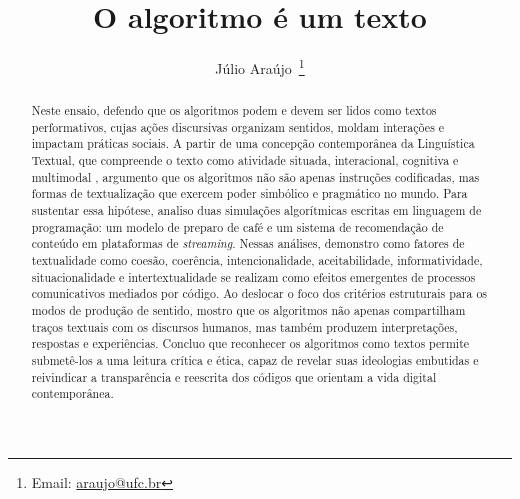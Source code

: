 \documentclass[portuguese]{textolivre}
\title{O algoritmo é um texto}
\author[1]{Júlio Araújo~\orcid{0000-0001-7399-3769}\thanks{Email: \href{mailto:araujo@ufc.br}{araujo@ufc.br}}}
\affil[1]{Universidade Federal do Ceará, Programa de Pós-Graduação em Linguística, Fortaleza, CE, Brasil.}
\begin{document}
\maketitle

\begin{polyabstract}
\begin{abstract}
Neste ensaio, defendo que os algoritmos podem e devem ser lidos como textos performativos, cujas ações discursivas organizam sentidos, moldam interações e impactam práticas sociais. A partir de uma concepção contemporânea da Linguística Textual, que compreende o texto como atividade situada, interacional, cognitiva e multimodal \cite{koch2006,marcuschi2008,beaugrande1997}, argumento que os algoritmos não são apenas instruções codificadas, mas formas de textualização que exercem poder simbólico e pragmático no mundo. Para sustentar essa hipótese, analiso duas simulações algorítmicas escritas em linguagem de programação: um modelo de preparo de café e um sistema de recomendação de conteúdo em plataformas de \textit{streaming}. Nessas análises, demonstro como fatores de textualidade como coesão, coerência, intencionalidade, aceitabilidade, informatividade, situacionalidade e intertextualidade se realizam como efeitos emergentes de processos comunicativos mediados por código. Ao deslocar o foco dos critérios estruturais para os modos de produção de sentido, mostro que os algoritmos não apenas compartilham traços textuais com os discursos humanos, mas também produzem interpretações, respostas e experiências. Concluo que reconhecer os algoritmos como textos permite submetê-los a uma leitura crítica e ética, capaz de revelar suas ideologias embutidas e reivindicar a transparência e reescrita dos códigos que orientam a vida digital contemporânea.

\end{abstract}


\end{polyabstract}
\end{document}
